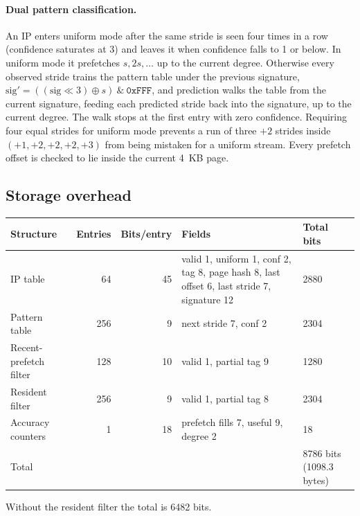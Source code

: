 \paragraph{Dual pattern classification.}
An IP enters uniform mode after the same stride is seen four times in a row (confidence saturates at 3) and leaves it when confidence falls to 1 or below.
In uniform mode it prefetches $s, 2s, \dots$ up to the current degree.
Otherwise every observed stride trains the pattern table under the previous signature,
$\mathrm{sig}' = ((\mathrm{sig} \ll 3)\oplus s)\ \&\ \mathtt{0xFFF}$,
and prediction walks the table from the current signature, feeding each predicted stride back into the signature, up to the current degree.
The walk stops at the first entry with zero confidence.
Requiring four equal strides for uniform mode prevents a run of three $+2$ strides inside $(+1,+2,+2,+2,+3)$ from being mistaken for a uniform stream.
Every prefetch offset is checked to lie inside the current 4~KB page.

\subsection{Storage overhead}
\begin{center}
\small
\begin{tabular}{lrrp{5.0cm}p{2.3cm}}
\toprule
Structure & Entries & Bits/entry & Fields & Total bits \\
\midrule
IP table & 64 & 45 & valid 1, uniform 1, conf 2, tag 8, page hash 8, last offset 6, last stride 7, signature 12 & 2880 \\
Pattern table & 256 & 9 & next stride 7, conf 2 & 2304 \\
Recent-prefetch filter & 128 & 10 & valid 1, partial tag 9 & 1280 \\
Resident filter & 256 & 9 & valid 1, partial tag 8 & 2304 \\
Accuracy counters & 1 & 18 & prefetch fills 7, useful 9, degree 2 & 18 \\
Total &  &  &  & 8786 bits (1098.3 bytes) \\
\bottomrule
\end{tabular}
\end{center}
Without the resident filter the total is 6482 bits.

